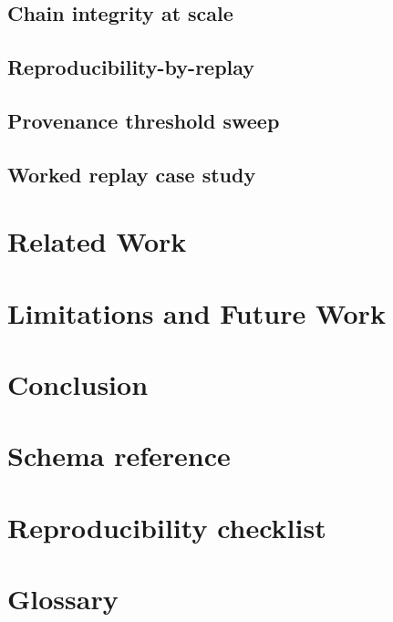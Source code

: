 \documentclass[11pt, letterpaper]{article}
\theoremstyle{definition}
\theoremstyle{plain}
\theoremstyle{remark}
\begin{document}
\subsection{Chain integrity at scale}
\label{sec:eval-chain}


\subsection{Reproducibility-by-replay}
\label{sec:eval-replay}


\subsection{Provenance threshold sweep}
\label{sec:eval-factum}


\subsection{Worked replay case study}
\label{sec:eval-case-study}


\section{Related Work}
\label{sec:related}


\section{Limitations and Future Work}
\label{sec:limitations}


\section{Conclusion}
\label{sec:conclusion}


\printbibliography

\appendix

\section{Schema reference}
\label{app:schema}


\section{Reproducibility checklist}
\label{app:repro}


\section{Glossary}
\label{app:glossary}

\end{document}
